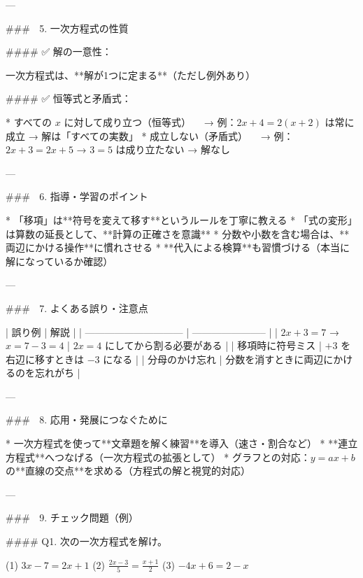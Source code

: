 \documentclass{jsarticle}
\begin{document}
---

### 🔷 5. 一次方程式の性質

#### ✅ 解の一意性：

一次方程式は、**解が1つに定まる**（ただし例外あり）

#### ✅ 恒等式と矛盾式：

* すべての $x$ に対して成り立つ（恒等式）
  　→ 例：$2x + 4 = 2(x + 2)$ は常に成立 → 解は「すべての実数」
* 成立しない（矛盾式）
  　→ 例：$2x + 3 = 2x + 5$ → $3 = 5$ は成り立たない → 解なし

---

### 🔷 6. 指導・学習のポイント

* 「移項」は**符号を変えて移す**というルールを丁寧に教える
* 「式の変形」は算数の延長として、**計算の正確さを意識**
* 分数や小数を含む場合は、**両辺にかける操作**に慣れさせる
* **代入による検算**も習慣づける（本当に解になっているか確認）

---

### 🔷 7. よくある誤り・注意点

| 誤り例                            | 解説                      |
| ------------------------------ | ----------------------- |
| $2x + 3 = 7$ → $x = 7 - 3 = 4$ | $2x = 4$ にしてから割る必要がある   |
| 移項時に符号ミス                       | $+3$ を右辺に移すときは $-3$ になる |
| 分母のかけ忘れ                        | 分数を消すときに両辺にかけるのを忘れがち    |

---

### 🔷 8. 応用・発展につなぐために

* 一次方程式を使って**文章題を解く練習**を導入（速さ・割合など）
* **連立方程式**へつなげる（一次方程式の拡張として）
* グラフとの対応：$y = ax + b$ の**直線の交点**を求める（方程式の解と視覚的対応）

---

### 🔷 9. チェック問題（例）

#### Q1. 次の一次方程式を解け。

(1) $3x - 7 = 2x + 1$
(2) $\frac{2x - 3}{5} = \frac{x + 1}{2}$
(3) $-4x + 6 = 2 - x$
\end{document}
